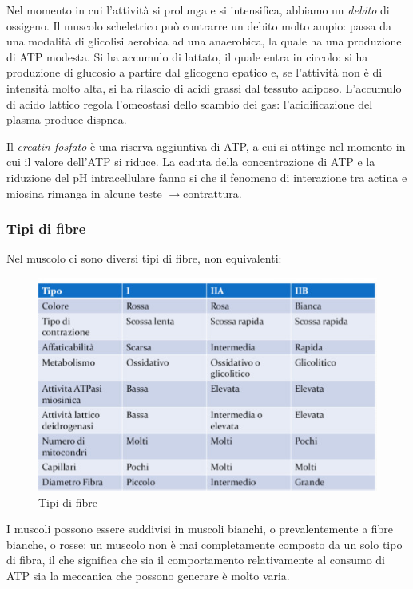 \documentclass[a4paper,12pt]{article}
\newcommand{\lfreccia}{\ensuremath{\longrightarrow}}
\begin{document}
Nel momento in cui l'attività si prolunga e si intensifica, abbiamo un \emph{debito} di ossigeno. Il muscolo scheletrico può contrarre un debito molto ampio: passa da una modalità di glicolisi aerobica ad una anaerobica, la quale ha una produzione di ATP modesta. Si ha accumulo di lattato, il quale entra in circolo: si ha produzione di glucosio a partire dal glicogeno epatico e, se l'attività non è di intensità molto alta, si ha rilascio di acidi grassi dal tessuto adiposo. 
L'accumulo di acido lattico regola l'omeostasi dello scambio dei gas: l'acidificazione del plasma produce dispnea.

Il \emph{creatin-fosfato} è una riserva aggiuntiva di ATP, a cui si attinge nel momento in cui il valore dell'ATP si riduce. La caduta della concentrazione di ATP e la riduzione del pH intracellulare fanno si che il fenomeno di interazione tra actina e miosina rimanga in alcune teste \lfreccia contrattura.

\subsubsection{Tipi di fibre}
Nel muscolo ci sono diversi tipi di fibre, non equivalenti: 
\begin{figure}[H]
\centering
\includegraphics[scale=0.5]{immagine/fibre.jpg}
\caption{Tipi di fibre}
\end{figure}

I muscoli possono essere suddivisi in muscoli bianchi, o prevalentemente a fibre bianche, o rosse: un muscolo non è mai completamente composto da un solo tipo di fibra, il che significa che sia il comportamento relativamente al consumo di ATP sia la meccanica che possono generare è molto varia.
\end{document}
